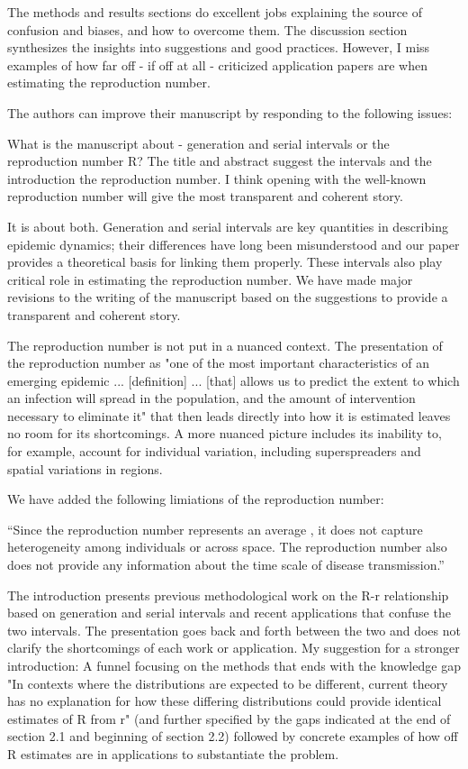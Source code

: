 \documentclass[12pt]{article}
\newcommand{\revtext}{\textsf}
\begin{document}
\revtext{The methods and results sections do excellent jobs explaining the source of confusion and biases, and how to overcome them. The discussion section synthesizes the insights into suggestions and good practices. However, I miss examples of how far off - if off at all - criticized application papers are when estimating the reproduction number.}

\revtext{The authors can improve their manuscript by responding to the following issues:}

\revtext{What is the manuscript about - generation and serial intervals or the reproduction number R? The title and abstract suggest the intervals and the introduction the reproduction number. I think opening with the well-known reproduction number will give the most transparent and coherent story.}

It is about both. Generation and serial intervals are key quantities in describing epidemic dynamics; their differences have long been misunderstood and our paper provides a theoretical basis for linking them properly. These intervals also play critical role in estimating the reproduction number. We have made major revisions to the writing of the manuscript based on the suggestions to provide a transparent and coherent story.

\revtext{The reproduction number is not put in a nuanced context. The presentation of the reproduction number as "one of the most important characteristics of an emerging epidemic ... [definition] ... [that] allows us to predict the extent to which an infection will spread in the population, and the amount of intervention necessary to eliminate it" that then leads directly into how it is estimated leaves no room for its shortcomings. A more nuanced picture includes its inability to, for example, account for individual variation, including superspreaders and spatial variations in regions.}

We have added the following limiations of the reproduction number:

``Since the reproduction number represents an average \citep{diekmann1990definition, anderson1991infectious}, it does not capture heterogeneity among individuals or across space.
The reproduction number also does not provide any information about the time scale of disease transmission.''

\revtext{The introduction presents previous methodological work on the R-r relationship based on generation and serial intervals and recent applications that confuse the two intervals. The presentation goes back and forth between the two and does not clarify the shortcomings of each work or application. My suggestion for a stronger introduction: A funnel focusing on the methods that ends with the knowledge gap "In contexts where the distributions are expected to be different, current theory has no explanation for how these differing distributions could provide identical estimates of R from r" (and further specified by the gaps indicated at the end of section 2.1 and beginning of section 2.2) followed by concrete examples of how off R estimates are in applications to substantiate the problem.}
\end{document}
